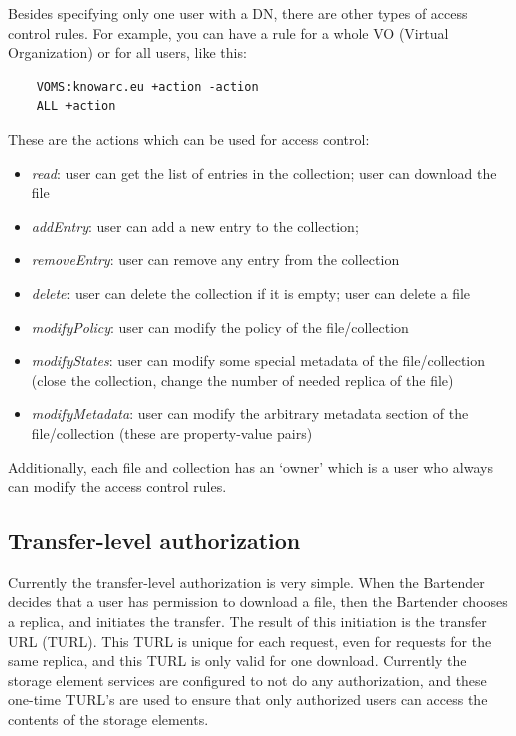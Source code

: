 \documentclass{book}
\begin{document}
Besides specifying only one user with a DN, there are other types of access control rules. For example, you can have a rule for a whole VO (Virtual Organization) or for all users, like this:

\begin{verbatim}
    VOMS:knowarc.eu +action -action 
    ALL +action
\end{verbatim}

These are the actions which can be used for access control:
\begin{itemize}
    \item \emph{read}: user can get the list of entries in the collection; user can download the file
    \item \emph{addEntry}: user can add a new entry to the collection;
    \item \emph{removeEntry}: user can remove any entry from the collection 
    \item \emph{delete}: user can delete the collection if it is empty; user can delete a file
    \item \emph{modifyPolicy}: user can modify the policy of the file/collection
    \item \emph{modifyStates}: user can modify some special metadata of the file/collection (close the collection, change the number of needed replica of the file)
    \item \emph{modifyMetadata}: user can modify the arbitrary metadata section of the file/collection (these are property-value pairs)
\end{itemize}

Additionally, each file and collection has an `owner' which is a user who always can modify the access control rules.



\subsection{Transfer-level authorization} %
\label{sub:transfer_level_authorization}

Currently the transfer-level authorization is very simple. When the Bartender decides that a user has permission to download a file, then the Bartender chooses a replica, and initiates the transfer. The result of this initiation is the transfer URL (TURL). This TURL is unique for each request, even for requests for the same replica, and this TURL is only valid for one download. Currently the storage element services are  configured to not do any authorization, and these one-time TURL's are used to ensure that only authorized users can access the contents of the storage elements. 
\end{document}

